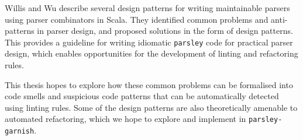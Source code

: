 Willis and Wu \cite{willis_design_2022} describe several design patterns for writing maintainable parsers using parser combinators in Scala.
They identified common problems and anti-patterns in parser design, and proposed solutions in the form of design patterns.
This provides a guideline for writing idiomatic \texttt{parsley} code for practical parser design, which enables opportunities for the development of linting and refactoring rules.

This thesis hopes to explore how these common problems can be formalised into code smells and suspicious code patterns that can be automatically detected using linting rules.
Some of the design patterns are also theoretically amenable to automated refactoring, which we hope to explore and implement in \texttt{parsley-garnish}.
